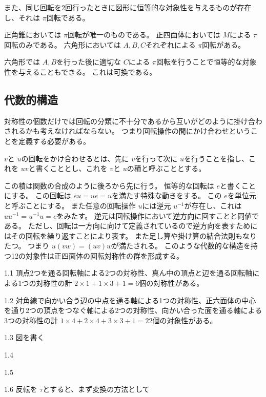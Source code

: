 \documentclass[dvipdfmx]{jsarticle}
\begin{document}
また、同じ回転を2回行ったときに図形に恒等的な対象性を与えるものが存在し、それは $\pi$回転である。

正角錐においては $\pi$回転が唯一のものである。
正四面体においては $M$による $\pi$回転のみである。
六角形においては $A,B,C$それぞれによる $\pi$回転がある。

六角形では $A,B$を行った後に適切な $C$による $\pi$回転を行うことで恒等的な対象性を与えることもできる。
これは可換である。

\subsection{代数的構造}
対称性の個数だけでは回転の分類に不十分であるから互いがどのように掛け合わされるかも考えなければならない。
つまり回転操作の間にかけ合わせということを定義する必要がある。

\begin{defi}
$v$と $u$の回転をかけ合わせるとは、先に $v$を行って次に $u$を行うことを指し、これを $uv$と書くこととし、これを $v$と $u$の積と呼ぶこととする。
\end{defi}

この積は関数の合成のように後ろから先に行う。
恒等的な回転は $e$と書くことにする。
この回転は $eu = ue = u$を満たす特殊な動きをする。
この $e$を単位元と呼ぶことにする。
また任意の回転操作 $u$には逆元 $u^{-1}$が存在し、これは
$uu^{-1} = u^{-1}u = e$をみたす。
逆元は回転操作において逆方向に回すことと同値である。
ただし、回転は一方向に向けて定義されているので逆方向を表すためにはその回転を繰り返すことにより表す。
また足し算や掛け算の結合法則もなりたつ。
つまり $u(vw) = (uv)w$が満たされる。
このような代数的な構造を持つ12の対象性は正四面体の回転対称性の群を形成する。

\begin{plob}

1.1 頂点2つを通る回転軸による2つの対称性、真ん中の頂点と辺を通る回転軸による1つの対称性の計 $2 \times 1 + 1 \times 3 + 1= 6$個の対称性がある。

1.2 対角線で向かい合う辺の中点を通る軸による1つの対称性、正六面体の中心を通り2つの頂点をつなぐ軸による2つの対称性、向かい合った面を通る軸による3つの対称性の計 $1 \times 4 + 2 \times 4 + 3 \times 3 + 1 = 22$個の対象性がある。

1.3 図を書く

1.4

1.5

1.6 反転を $\tau$とすると、まず変換の方法として 
\end{plob}
\end{document}
